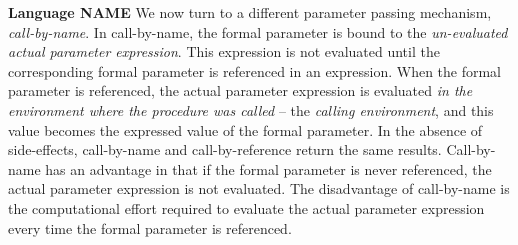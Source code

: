 \begin{minipage}[t]{\sw}
\slidenumber
\LARGE
{\bf Language NAME}\exx
We now turn to a different parameter passing mechanism,
{\em call-by-name}.\exx
In call-by-name, the formal parameter is bound
to the {\em un-evaluated actual parameter expression}.
This expression is not evaluated
until the corresponding formal parameter is referenced in an expression.
When the formal parameter is referenced,
the actual parameter expression is evaluated
{\em in the environment where the procedure was called}
-- the {\em calling environment},
and this value becomes the expressed value of the formal parameter.\exx
In the absence of side-effects, call-by-name and call-by-reference
return the same results.
Call-by-name has an advantage
in that if the formal parameter is never referenced,
the actual parameter expression is not evaluated.
The disadvantage of call-by-name is the computational effort required
to evaluate the actual parameter expression every time
the formal parameter is referenced.\exx
\end{minipage}
